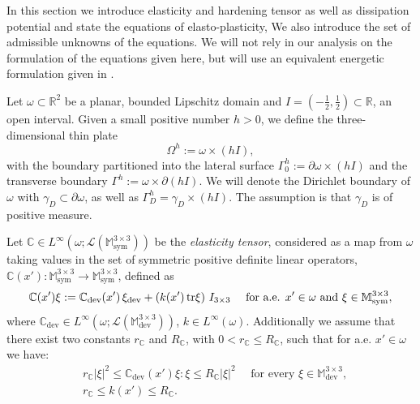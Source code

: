 \documentclass[reqno,10pt]{amsart}
\numberwithin{equation}{section}
\theoremstyle{remark}
\newcommand{\C}{\mathbb{C}}
\newcommand{\M}{\mathbb{M}}
\newcommand{\R}{\mathbb{R}}
\DeclareMathOperator{\dev}{dev}
\DeclareMathOperator{\sym}{sym}
\begin{document}
In this section we introduce elasticity and hardening tensor as well as dissipation potential and state the equations of elasto-plasticity, We also introduce the set of admissible unknowns of the equations.
We will not rely in our analysis on the formulation of the equations given here, but will use an equivalent energetic formulation given in .

Let $\omega\subset\R^2$ be a planar, bounded Lipschitz domain and $I = \left(-\frac{1}{2}, \frac{1}{2}\right)\subset \R$, an open interval.
Given a small positive number $h>0$, we define the three-dimensional thin plate
\[
\Omega^h := \omega \times (h I),
\]
with the boundary partitioned into the lateral surface $\Gamma^h_0 := \partial\omega \times (h I)$ and the transverse boundary $\Gamma^h := \omega \times \partial(h I)$.
We will denote the Dirichlet boundary of $\omega$ with $\gamma_D \subset \partial \omega$, as well as $\Gamma_D^h = \gamma_D \times (hI)$.
The assumption is that $\gamma_D$ is of positive measure.

\medskip
{} \nopagebreak

Let $\C \in L^\infty(\omega; \mathcal{L}(\M^{3 \times 3}_{\sym}))$ be the {\em elasticity tensor}, considered as a map from $\omega$ taking values in the set of symmetric positive definite linear operators, $\C(x'): \M^{3 \times 3}_{\sym} \to \M^{3 \times 3}_{\sym}$, defined as
\begin{equation*}
	\C(x') \xi := \C_{\dev}(x')\,\xi_{\dev} + \left(k(x')\,{\rm tr}{\xi}\right)\,I_{3 \times 3} \quad \text{ for a.e. } x' \in \omega \text{ and } \xi \in \M^{3 \times 3}_{\sym},
\end{equation*}
where $\C_{\dev} \in L^\infty(\omega; \mathcal{L}(\M^{3 \times 3}_{\dev}))$, $k \in L^\infty(\omega)$.
Additionally we assume that there exist two constants $r_{\C}$ and $R_{\C}$, with $0 < r_{\C} \leq R_{\C}$, such that for a.e. $x' \in \omega$ we have:
\begin{align*}
	& r_{\C} |\xi|^2 \leq \C_{\dev}(x') \xi : \xi \leq R_{\C} |\xi|^2 \quad \text{ for every }\xi \in \M^{3 \times 3}_{\dev},\\
	& r_{\C} \leq k(x') \leq R_{\C}.
\end{align*}

\medskip
{} \nopagebreak
\end{document}
